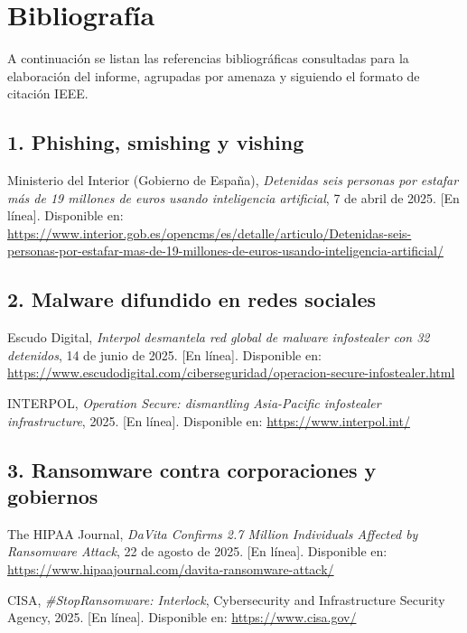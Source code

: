 \chapter{Bibliografía}

A continuación se listan las referencias bibliográficas consultadas para la elaboración del informe, agrupadas por amenaza y siguiendo el formato de citación IEEE.

\section*{1. Phishing, smishing y vishing}
\begin{enumerate}[label={[}\arabic*{]}]
    \item Ministerio del Interior (Gobierno de España), \textit{Detenidas seis personas por estafar más de 19 millones de euros usando inteligencia artificial}, 7 de abril de 2025. [En línea]. Disponible en: \url{https://www.interior.gob.es/opencms/es/detalle/articulo/Detenidas-seis-personas-por-estafar-mas-de-19-millones-de-euros-usando-inteligencia-artificial/}
\end{enumerate}

\section*{2. Malware difundido en redes sociales}
\begin{enumerate}[label={[}\arabic*{]}, start=3]
    \item Escudo Digital, \textit{Interpol desmantela red global de malware infostealer con 32 detenidos}, 14 de junio de 2025. [En línea]. Disponible en: \url{https://www.escudodigital.com/ciberseguridad/operacion-secure-infostealer.html}
    \item INTERPOL, \textit{Operation Secure: dismantling Asia-Pacific infostealer infrastructure}, 2025. [En línea]. Disponible en: \url{https://www.interpol.int/}
\end{enumerate}

\section*{3. Ransomware contra corporaciones y gobiernos}
\begin{enumerate}[label={[}\arabic*{]}, start=5]
    \item The HIPAA Journal, \textit{DaVita Confirms 2.7 Million Individuals Affected by Ransomware Attack}, 22 de agosto de 2025. [En línea]. Disponible en: \url{https://www.hipaajournal.com/davita-ransomware-attack/}
    \item CISA, \textit{\#StopRansomware: Interlock}, Cybersecurity and Infrastructure Security Agency, 2025. [En línea]. Disponible en: \url{https://www.cisa.gov/}
\end{enumerate}

